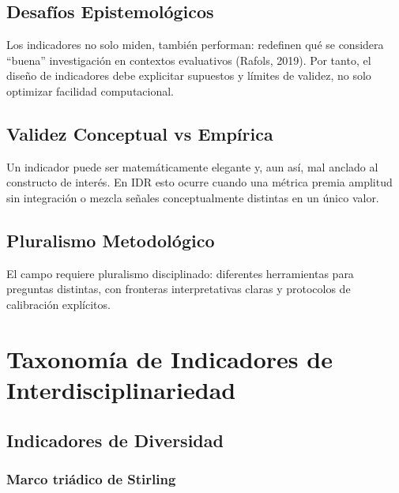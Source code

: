 \documentclass[
]{article}
\begin{document}
\hypertarget{desafuxedos-epistemoluxf3gicos}{%
\subsection{Desafíos
Epistemológicos}\label{desafuxedos-epistemoluxf3gicos}}

Los indicadores no solo miden, también performan: redefinen qué se
considera ``buena'' investigación en contextos evaluativos (Rafols,
2019). Por tanto, el diseño de indicadores debe explicitar supuestos y
límites de validez, no solo optimizar facilidad computacional.

\hypertarget{validez-conceptual-vs-empuxedrica}{%
\subsection{Validez Conceptual vs
Empírica}\label{validez-conceptual-vs-empuxedrica}}

Un indicador puede ser matemáticamente elegante y, aun así, mal anclado
al constructo de interés. En IDR esto ocurre cuando una métrica premia
amplitud sin integración o mezcla señales conceptualmente distintas en
un único valor.

\hypertarget{pluralismo-metodoluxf3gico}{%
\subsection{Pluralismo Metodológico}\label{pluralismo-metodoluxf3gico}}

El campo requiere pluralismo disciplinado: diferentes herramientas para
preguntas distintas, con fronteras interpretativas claras y protocolos
de calibración explícitos.

\hypertarget{taxonomuxeda-de-indicadores-de-interdisciplinariedad}{%
\section{Taxonomía de Indicadores de
Interdisciplinariedad}\label{taxonomuxeda-de-indicadores-de-interdisciplinariedad}}

\hypertarget{indicadores-de-diversidad}{%
\subsection{Indicadores de Diversidad}\label{indicadores-de-diversidad}}

\hypertarget{marco-triuxe1dico-de-stirling}{%
\subsubsection{Marco triádico de
Stirling}\label{marco-triuxe1dico-de-stirling}}
\end{document}
